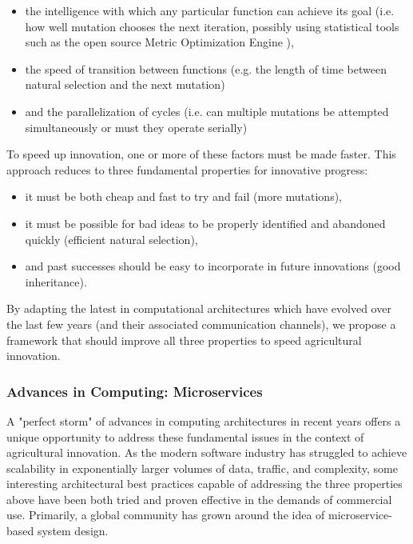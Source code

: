 \documentclass[11pt]{article}
\begin{document}
\begin{itemize}
\item the intelligence with which any particular function can achieve its goal (i.e. how well mutation chooses the next iteration, possibly 
	using statistical tools such as the open source Metric Optimization Engine \cite{MOE:16}),
\item the speed of transition between functions (e.g. the length of time between natural selection and the next mutation)
\item and the parallelization of cycles (i.e. can multiple mutations be attempted simultaneously or must they operate serially)
\end{itemize}

To speed up innovation, one or more of these factors must be made faster.  This approach reduces to three fundamental properties 
for innovative progress:

\begin{itemize}
\item it must be both cheap and fast to try and fail (more mutations),
\item it must be possible for bad ideas to be properly identified and abandoned quickly (efficient natural selection),
\item and past successes should be easy to incorporate in future innovations (good inheritance).
\end{itemize}

By adapting the latest in computational architectures which have evolved over the last few years (and their associated communication channels), we propose a framework that should improve all three properties to speed agricultural innovation.

\subsubsection{Advances in Computing: Microservices}   

A "perfect storm" of advances in computing architectures in recent years offers a unique opportunity to 
address these fundamental issues in the 
context of agricultural innovation.  As the modern software industry has struggled to achieve scalability in exponentially larger volumes of 
data, traffic, and complexity, some interesting architectural best practices capable of addressing the three properties above have been 
both tried and proven effective in the demands of commercial use.  Primarily, a global community has grown around the idea of 
microservice-based system design. 
\end{document}

